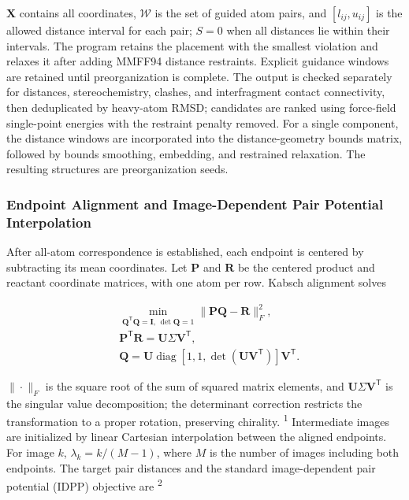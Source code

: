 $\mathbf X$ contains all coordinates, $\mathcal W$ is the set of guided atom pairs, and $[l_{ij},u_{ij}]$ is the allowed distance interval for each pair; $S=0$ when all distances lie within their intervals. The program retains the placement with the smallest violation and relaxes it after adding MMFF94 distance restraints. Explicit guidance windows are retained until preorganization is complete. The output is checked separately for distances, stereochemistry, clashes, and interfragment contact connectivity, then deduplicated by heavy-atom RMSD; candidates are ranked using force-field single-point energies with the restraint penalty removed. For a single component, the distance windows are incorporated into the distance-geometry bounds matrix, followed by bounds smoothing, embedding, and restrained relaxation. The resulting structures are preorganization seeds.

\subsubsection{Endpoint Alignment and Image-Dependent Pair Potential Interpolation}

After all-atom correspondence is established, each endpoint is centered by subtracting its mean coordinates. Let $\mathbf P$ and $\mathbf R$ be the centered product and reactant coordinate matrices, with one atom per row. Kabsch alignment solves

\begin{equation}\label{eq:methods-7}
\begin{aligned}
&\min_{\mathbf Q^{\mathsf T}\mathbf Q=\mathbf I,\,\det\mathbf Q=1}
\|\mathbf P\mathbf Q-\mathbf R\|_F^2,\\
&\mathbf P^{\mathsf T}\mathbf R=\mathbf U\Sigma\mathbf V^{\mathsf T},\\
&\mathbf Q=\mathbf U\operatorname{diag}[1,1,\det(\mathbf U\mathbf V^{\mathsf T})]\mathbf V^{\mathsf T}.
\end{aligned}
\end{equation}

$\|\cdot\|_F$ is the square root of the sum of squared matrix elements, and $\mathbf U\Sigma\mathbf V^{\mathsf T}$ is the singular value decomposition; the determinant correction restricts the transformation to a proper rotation, preserving chirality. \textsuperscript{1} Intermediate images are initialized by linear Cartesian interpolation between the aligned endpoints. For image $k$, $\lambda_k=k/(M-1)$, where $M$ is the number of images including both endpoints. The target pair distances and the standard image-dependent pair potential (IDPP) objective are \textsuperscript{2}

